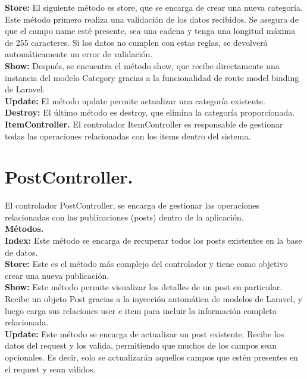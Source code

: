 \documentclass[11pt, a4paper, oneside]{book}
\begin{document}
\textbf {Store:} El siguiente método es store, que se encarga de crear una nueva categoría. Este método primero realiza una validación de los datos recibidos. Se asegura de que el campo name esté presente, sea una cadena y tenga una longitud máxima de 255 caracteres. Si los datos no cumplen con estas reglas, se devolverá automáticamente un error de validación.\\ 

\textbf {Show:} Después, se encuentra el método show, que recibe directamente una instancia del modelo Category gracias a la funcionalidad de route model binding de Laravel.\\

\textbf {Update:} El método update permite actualizar una categoría existente. \\

\textbf {Destroy:} El último método es destroy, que elimina la categoría proporcionada. \\

\textbf {ItemController.}
El controlador ItemController es responsable de gestionar todas las operaciones relacionadas con los items dentro del sistema.\\

\section{\textbf {PostController.}}

El controlador PostController, se encarga de gestionar las operaciones relacionadas con las publicaciones (posts) dentro de la aplicación. \\

\textbf {Métodos.}\\

\textbf {Index:} Este método se encarga de recuperar todos los posts existentes en la base de datos. \\

\textbf {Store:} Este es el método más complejo del controlador y tiene como objetivo crear una nueva publicación.\\

\textbf {Show:} Este método permite visualizar los detalles de un post en particular. Recibe un objeto Post gracias a la inyección automática de modelos de Laravel, y luego carga sus relaciones user e item para incluir la información completa relacionada.\\

\textbf {Update:} Este método se encarga de actualizar un post existente. Recibe los datos del request y los valida, permitiendo que muchos de los campos sean opcionales. Es decir, solo se actualizarán aquellos campos que estén presentes en el request y sean válidos.\\
\end{document}
